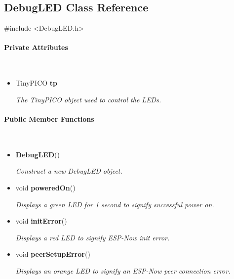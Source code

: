\subsection{DebugLED Class Reference}
\label{subsec:debugled1}\mbox{}

    \ttfamily{}

    \#include <DebugLED.h>\\

    \rmfamily{}

    \paragraph{Private Attributes}\mbox{}\\

        \begin{itemize}
            \item TinyPICO \textbf{tp}
            
                \quad \quad \textit{The TinyPICO object used to control the LEDs.}\\

        \end{itemize}


    \paragraph{Public Member Functions}\mbox{}\\

        \begin{itemize}
            \item \textbf{DebugLED}() 
            
                \quad \quad \textit{Construct a new DebugLED object.}

            \item void \textbf{poweredOn}() 
            
                \quad \quad \textit{Displays a green LED for 1 second to signify successful power on.}

            \item void \textbf{initError}() 
            
                \quad \quad \textit{Displays a red LED to signify ESP-Now init error.}

            \item void \textbf{peerSetupError}() 
            
                \quad \quad \textit{Displays an orange LED to signify an ESP-Now peer connection error.}\\
        \end{itemize}

